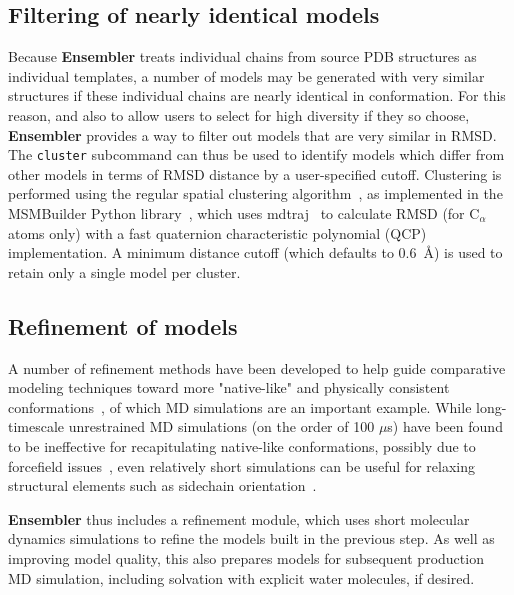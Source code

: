 \documentclass[aps,prl,preprint,nofootinbib,superscriptaddress,linenumbers]{revtex4-1}
\begin{document}
\subsection*{Filtering of nearly identical models}

Because {\bf Ensembler} treats individual chains from source PDB structures as individual templates, a number of models may be generated with very similar structures if these individual chains are nearly identical in conformation.
For this reason, and also to allow users to select for high diversity if they so choose, {\bf Ensembler} provides a way to filter out models that are very similar in RMSD.
The {\tt cluster} subcommand can thus be used to identify models which differ from other models in terms of RMSD distance by a user-specified cutoff.
Clustering is performed using the regular spatial clustering algorithm~\cite{noe:jcp:2011:msm-review}, as implemented in the MSMBuilder Python library~\cite{msmbuilder}, which uses mdtraj~\cite{mdtraj} to calculate RMSD (for C$_\alpha$ atoms only) with a fast quaternion characteristic polynomial (QCP)~\cite{theobald:acta-cryst-a:2005:qcp,theobald:j-comput-chem:2010:qcp,theobald:j-comput-chem:2011:qcp} implementation.
A minimum distance cutoff (which defaults to 0.6~\AA) is used to retain only a single model per cluster.

\subsection{Refinement of models}

A number of refinement methods have been developed to help guide comparative modeling techniques toward more "native-like" and physically consistent conformations~\cite{maccallum:prot:2011:casp-refinement,zhang:curr-opin-struct-biol:2009:structure-prediction}, of which MD simulations are an important example.
While long-timescale unrestrained MD simulations (on the order of 100 $\mu$s) have been found to be ineffective for recapitulating native-like conformations, possibly due to forcefield issues~\cite{raval:prot:2012:long-timescale-md-refinement}, even relatively short simulations can be useful for relaxing structural elements such as sidechain orientation~\cite{zhang:curr-opin-struct-biol:2009:structure-prediction}.

{\bf Ensembler} thus includes a refinement module, which uses short molecular dynamics simulations to refine the models built in the previous step.
As well as improving model quality, this also prepares models for subsequent production MD simulation, including solvation with explicit water molecules, if desired.
\end{document}
